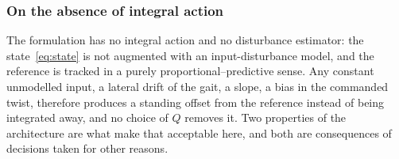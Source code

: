 \documentclass[11pt,a4paper]{article}
\newcommand{\dsafe}{d_{\mathrm{safe}}}
\begin{document}




\subsubsection{On the absence of integral action}
\label{sec:integral}

The formulation has no integral action and no disturbance estimator: the state~\eqref{eq:state} is not
augmented with an input-disturbance model, and the reference is tracked in a purely
proportional--predictive sense. Any constant unmodelled input, a lateral drift of the gait, a slope, a
bias in the commanded twist, therefore produces a standing offset from the reference instead of being
integrated away, and no choice of $Q$ removes it. Two properties of the architecture are what make that
acceptable here, and both are consequences of decisions taken for other reasons.
\end{document}

